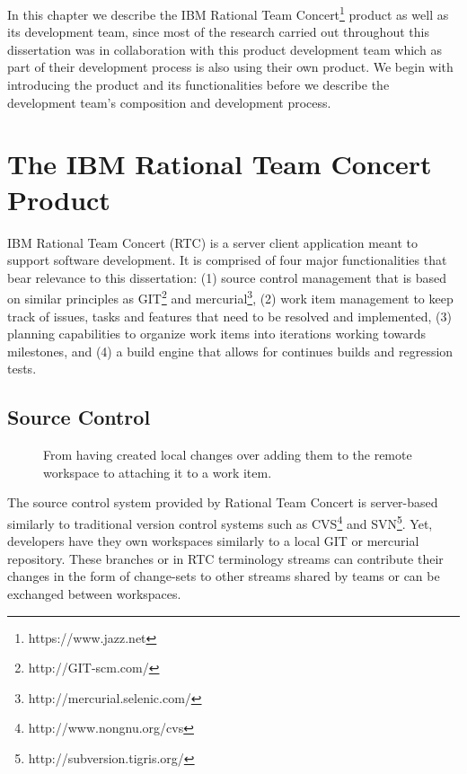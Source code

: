 \label{chap:rtc}
In this chapter we describe the IBM Rational Team Concert\footnote{https://www.jazz.net} product as well as its development team,
since most of the research carried out throughout this dissertation was in collaboration with this product development team which as part of their development process is also using their own product.
We begin with introducing the product and its functionalities before we describe the development team's composition and development process.

\section{The IBM Rational Team Concert Product}
IBM Rational Team Concert (RTC) is a server client application meant to support software development.
It is comprised of four major functionalities that bear relevance to this dissertation:
(1) source control management that is based on similar principles as GIT\footnote{http://GIT-scm.com/} and mercurial\footnote{http://mercurial.selenic.com/}, (2) work item management to keep track of issues, tasks and features that need to be resolved and implemented, (3) planning capabilities to organize work items into iterations working towards milestones, and (4) a build engine that allows for continues builds and regression tests.

\subsection{Source Control}
\begin{figure}
\centering
{}


\caption{From having created local changes over adding them to the remote workspace to attaching it to a work item.}
\label{fig:change-set}
\end{figure}

The source control system provided by Rational Team Concert is server-based similarly to traditional version control systems such as CVS\footnote{http://www.nongnu.org/cvs} and SVN\footnote{http://subversion.tigris.org/}.
Yet, developers have they own workspaces similarly to a local GIT or mercurial repository.
These branches or in RTC terminology streams can contribute their changes in the form of change-sets to other streams shared by teams or can be exchanged between workspaces.

